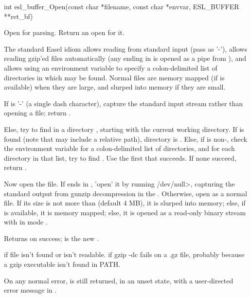 \begin{sreapi}
\hypertarget{func:esl_buffer_Open()}
{\item[int esl\_buffer\_Open(const char *filename, const char *envvar, ESL\_BUFFER **ret\_bf)]}

Open  for parsing. Return an open
 for it.

The standard Easel idiom allows reading from standard
input (pass  as '-'), allows reading gzip'ed
files automatically (any  ending in  is
opened as a pipe from ), and allows using an
environment variable to specify a colon-delimited list
of directories in which  may be found. Normal
files are memory mapped (if  is available) when
they are large, and slurped into memory if they are
small.

If  is '-' (a single dash character), 
capture the standard input stream rather than 
opening a file; return .

Else, try to find  in a directory ,
starting with the current working directory. If
 is found (note that  may include
a relative path), directory  is .  Else, if
 is non-, check the environment variable
 for a colon-delimited list of directories, and
for each directory  in that list, try to find
. Use the first  that succeeds. If
none succeed, return .

Now open the file. If  ends in , 'open'
it by running /dev/null>,
capturing the standard output from gunzip decompression
in the . Otherwise, open  as a
normal file. If its size is not more than
 (default 4 MB), it is slurped into
memory; else, if  is available, it is memory
mapped; else, it is opened as a read-only binary stream
with  in mode .

Returns  on success;  is the new .

 if file isn't found or isn't readable.
 if gzip -dc fails on a .gz file, probably 
because a gzip executable isn't found in PATH. 

On any normal error,  is still returned,
in an unset state, with a user-directed error message
in .


\end{sreapi}
